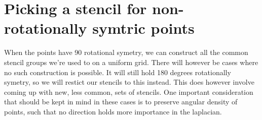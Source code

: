 \documentclass[12p,a4paper]{article}
\begin{document}
\section{Picking a stencil for non-rotationally symtric points}
When the points have 90 rotational symetry, we can construct all the common stencil groups we're used to on a uniform grid. There will however be cases where no such construction is possible. It will still hold 180 degrees rotationally symetry, so we will restict our stencils to this instead. This does however involve coming up with new, less common, sets of stencils. One important consideration that should be kept in mind in these cases is to preserve angular density of points, such that no direction holds more importance in the laplacian.
\end{document}
